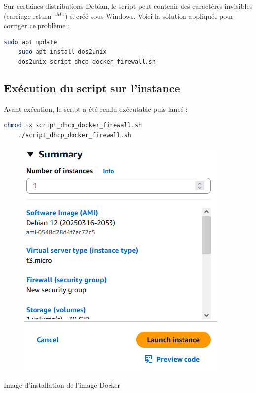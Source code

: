 Sur certaines distributions Debian, le script peut contenir des caractères invisibles (carriage return $ `^M` $) si créé sous Windows. Voici la solution appliquée pour corriger ce problème :

\begin{lstlisting}[language=bash]
	sudo apt update
	sudo apt install dos2unix
	dos2unix script_dhcp_docker_firewall.sh
\end{lstlisting}

\subsection*{Exécution du script sur l’instance}

Avant exécution, le script a été rendu exécutable puis lancé :

\begin{lstlisting}[language=bash]
	chmod +x script_dhcp_docker_firewall.sh
	./script_dhcp_docker_firewall.sh
\end{lstlisting}

\begin{figure}[h!]
	\centering
	\includegraphics[width=1\linewidth]{corps/images/image10}
	\label{fig:10}
\end{figure}
\begin{center}
	Image d’installation de l’image Docker
\end{center}
